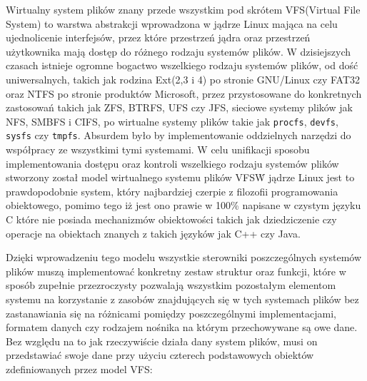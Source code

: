 \documentclass[10pt]{article}
\begin{document}
Wirtualny system plików znany przede wszystkim pod skrótem VFS(Virtual File System) to warstwa abstrakcji wprowadzona w jądrze Linux mająca na celu ujednolicenie interfejsów, przez które przestrzeń jądra oraz przestrzeń użytkownika mają dostęp do różnego rodzaju systemów plików. W dzisiejszych czasach istnieje ogromne bogactwo wszelkiego rodzaju systemów plików, od dość uniwersalnych, takich jak rodzina Ext(2,3 i 4) po stronie GNU/Linux czy FAT32 oraz NTFS po stronie produktów Microsoft, przez przystosowane do konkretnych zastosowań takich jak ZFS, BTRFS, UFS czy JFS, sieciowe systemy plików jak NFS, SMBFS i CIFS, po wirtualne systemy plików takie jak \texttt{procfs}, \texttt{devfs}, \texttt{sysfs} czy \texttt{tmpfs}. Absurdem było by implementowanie oddzielnych narzędzi do współpracy ze wszystkimi tymi systemami. W celu unifikacji sposobu implementowania dostępu oraz kontroli wszelkiego rodzaju systemów plików stworzony został model wirtualnego systemu plików VFS\. W jądrze Linux jest to prawdopodobnie system, który najbardziej czerpie z filozofii programowania obiektowego, pomimo tego iż jest ono prawie w 100\% napisane w czystym języku C które nie posiada mechanizmów obiektowości takich jak dziedziczenie czy operacje na obiektach znanych z takich języków jak C++ czy Java.

Dzięki wprowadzeniu tego modelu wszystkie sterowniki poszczególnych systemów plików muszą implementować konkretny zestaw struktur oraz funkcji, które w sposób zupełnie przezroczysty pozwalają wszystkim pozostałym elementom systemu na korzystanie z zasobów znajdujących się w tych systemach plików bez zastanawiania się na różnicami pomiędzy poszczególnymi implementacjami, formatem danych czy rodzajem nośnika na którym przechowywane są owe dane. Bez względu na to jak rzeczywiście działa dany system plików, musi on przedstawiać swoje dane przy użyciu czterech podstawowych obiektów zdefiniowanych przez model VFS:
\end{document}
